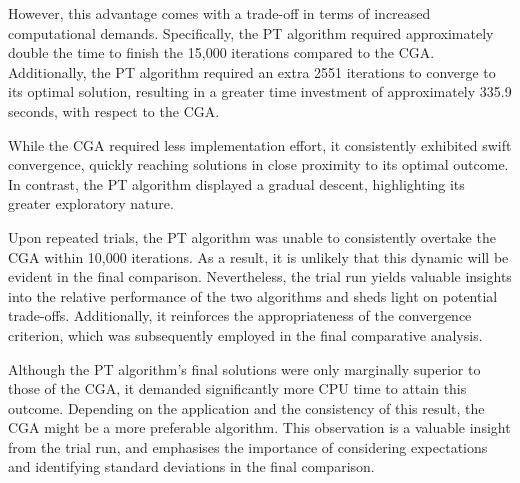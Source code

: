 \documentclass[10pt]{article}
\begin{document}
\begin{multicols}{2}
However, this advantage comes with a trade-off in terms of increased computational demands. Specifically, the PT algorithm required approximately double the time to finish the 15,000 iterations compared to the CGA. Additionally, the PT algorithm required an extra 2551 iterations to converge to its optimal solution, resulting in a greater time investment of approximately 335.9 seconds, with respect to the CGA.

While the CGA required less implementation effort, it consistently exhibited swift convergence, quickly reaching solutions in close proximity to its optimal outcome. In contrast, the PT algorithm displayed a gradual descent, highlighting its greater exploratory nature. 

Upon repeated trials, the PT algorithm was unable to consistently overtake the CGA within 10,000 iterations. As a result, it is unlikely that this dynamic will be evident in the final comparison. Nevertheless, the trial run yields valuable insights into the relative performance of the two algorithms and sheds light on potential trade-offs. Additionally, it reinforces the appropriateness of the convergence criterion, which was subsequently employed in the final comparative analysis.

Although the PT algorithm's final solutions were only marginally superior to those of the CGA, it demanded significantly more CPU time to attain this outcome. Depending on the application and the consistency of this result, the CGA might be a more preferable algorithm. This observation is a valuable insight from the trial run, and emphasises the importance of considering expectations and identifying standard deviations in the final comparison.


\end{multicols}
\end{document}
